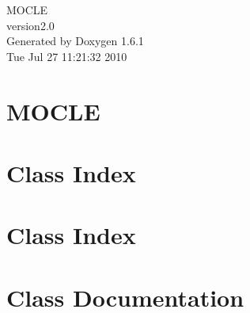 \documentclass[a4paper]{book}
\begin{document}
\hypersetup{pageanchor=false}
\begin{titlepage}
\vspace*{7cm}
\begin{center}
{\Large MOCLE \\[1ex]\large version2.0 }\\
\vspace*{1cm}
{\large Generated by Doxygen 1.6.1}\\
\vspace*{0.5cm}
{\small Tue Jul 27 11:21:32 2010}\\
\end{center}
\end{titlepage}
\clearemptydoublepage
{}
\tableofcontents
\clearemptydoublepage
{}
\hypersetup{pageanchor=true}
\chapter{MOCLE}
\label{index}\hypertarget{index}{}
\chapter{Class Index}

\chapter{Class Index}

\chapter{Class Documentation}

















\printindex
\end{document}
